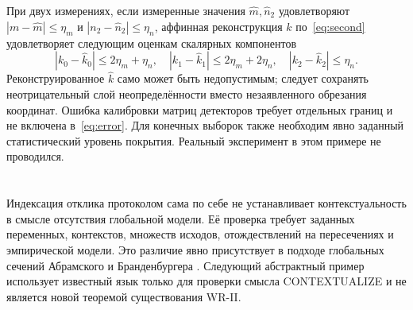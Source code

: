 {При двух измерениях, если измеренные значения $\widehat m,\widehat n_2$ удовлетворяют $|m-\widehat m|\leq\eta_m$ и $|n_2-\widehat n_2|\leq\eta_n$, аффинная реконструкция $\widehat k$ по~\eqref{eq:second} удовлетворяет следующим оценкам скалярных компонентов}
\begin{equation}\label{eq:error}
 |k_0-\widehat k_0|\leq2\eta_m+\eta_n,\quad
 |k_1-\widehat k_1|\leq2\eta_m+2\eta_n,\quad
 |k_2-\widehat k_2|\leq\eta_n.
\end{equation}
{Реконструированное $\widehat k$ само может быть недопустимым; следует сохранять неотрицательный слой неопределённости вместо незаявленного обрезания координат. Ошибка калибровки матриц детекторов требует отдельных границ и не включена в~\eqref{eq:error}. Для конечных выборок также необходим явно заданный статистический уровень покрытия. Реальный эксперимент в этом примере не проводился.}

\section{}
\label{sec:context}
{Индексация отклика протоколом сама по себе не устанавливает контекстуальность в смысле отсутствия глобальной модели. Её проверка требует заданных переменных, контекстов, множеств исходов, отождествлений на пересечениях и эмпирической модели. Это различие явно присутствует в подходе глобальных сечений Абрамского и Бранденбургера \cite{AB}. Следующий абстрактный пример использует известный язык только для проверки смысла CONTEXTUALIZE и не является новой теоремой существования WR-II.}

